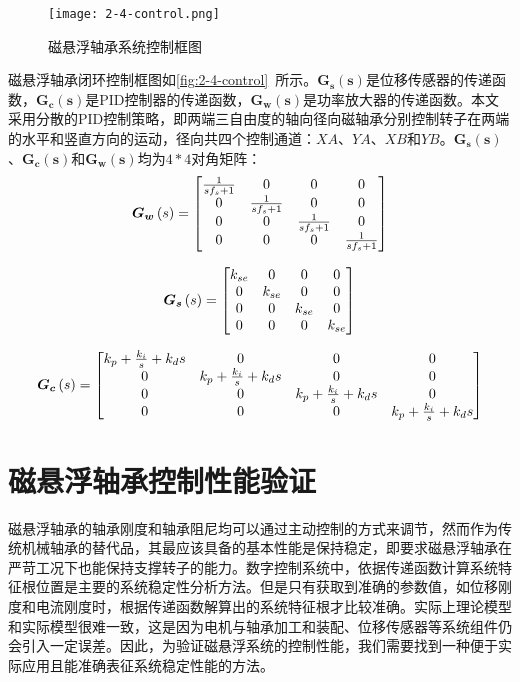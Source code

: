 \documentclass[
  lang=cn,
  degree=master,
  openany,oneside
]{nuaathesis}
\begin{document}
\begin{figure}[h!]
	\texttt{[image: 2-4-control.png]}
	\caption{磁悬浮轴承系统控制框图}
	\label{fig:2-4-control}
\end{figure}

磁悬浮轴承闭环控制框图如\autoref{fig:2-4-control}~所示。$\boldsymbol{G_s(s)}$是位移传感器的传递函数，$\boldsymbol{G_c(s)}$是PID控制器的传递函数，$\boldsymbol{G_w(s)}$是功率放大器的传递函数。本文采用分散的PID控制策略，即两端三自由度的轴向径向磁轴承分别控制转子在两端的水平和竖直方向的运动，径向共四个控制通道：$XA$、$YA$、$XB$和$YB$。$\boldsymbol{G_s(s)}$、$\boldsymbol{G_c(s)}$和$\boldsymbol{G_w(s)}$均为$4*4$对角矩阵：
$$\boldsymbol{G_w}\left( s \right) = \left[ 
{\begin{matrix}
   {{1 \over {s{f_s} + 1}}} & 0 & 0 & 0  \cr 
   0 & {{1 \over {s{f_s} + 1}}} & 0 & 0  \cr 
   0 & 0 & {{1 \over {s{f_s} + 1}}} & 0  \cr 
   0 & 0 & 0 & {{1 \over {s{f_s} + 1}}}  \cr 

 \end{matrix} }
\right]$$

$$\boldsymbol{G_s}\left( s \right) = \left[ 
{\begin{matrix}
   {{k_{se}}} & 0 & 0 & 0  \cr 
   0 & {{k_{se}}} & 0 & 0  \cr 
   0 & 0 & {{k_{se}}} & 0  \cr 
   0 & 0 & 0 & {{k_{se}}}  \cr 

 \end{matrix} } 
 \right]$$
 
$$\boldsymbol{G_c}\left( s \right) = \left[ {\begin{matrix}
   {{k_p} + {{{k_i}} \over s} + {k_d}s} & 0 & 0 & 0  \cr 
   0 & {{k_p} + {{{k_i}} \over s} + {k_d}s} & 0 & 0  \cr 
   0 & 0 & {{k_p} + {{{k_i}} \over s} + {k_d}s} & 0  \cr 
   0 & 0 & 0 & {{k_p} + {{{k_i}} \over s} + {k_d}s}  \cr 

 \end{matrix} } \right]$$


\section{磁悬浮轴承控制性能验证}
磁悬浮轴承的轴承刚度和轴承阻尼均可以通过主动控制的方式来调节，然而作为传统机械轴承的替代品，其最应该具备的基本性能是保持稳定，即要求磁悬浮轴承在严苛工况下也能保持支撑转子的能力。数字控制系统中，依据传递函数计算系统特征根位置是主要的系统稳定性分析方法。但是只有获取到准确的参数值，如位移刚度和电流刚度时，根据传递函数解算出的系统特征根才比较准确。实际上理论模型和实际模型很难一致，这是因为电机与轴承加工和装配、位移传感器等系统组件仍会引入一定误差。因此，为验证磁悬浮系统的控制性能，我们需要找到一种便于实际应用且能准确表征系统稳定性能的方法。
\end{document}
